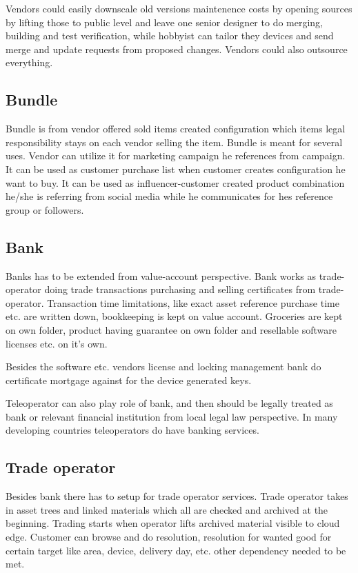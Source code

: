Vendors could easily downscale old versions maintenence costs by opening
sources by lifting those to public level and leave one senior designer to
do merging, building and test verification, while hobbyist can tailor they
devices and send merge and update requests from proposed changes. Vendors
could also outsource everything.

\subsection{Bundle}\label{bundle}
Bundle is from vendor offered sold items created configuration which items
legal responsibility stays on each vendor selling the item. Bundle is meant
for several uses. Vendor can utilize it for marketing campaign he references
from campaign. It can be used as customer purchase list when customer creates
configuration he want to buy. It can be used as influencer-customer created
product combination he/she is referring from social media while he
communicates for hes reference group or followers.

\subsection{Bank}\label{bank}
Banks has to be extended from value-account perspective. Bank works as
trade-operator doing trade transactions purchasing and selling certificates
from trade-operator. Transaction time limitations, like exact asset reference
purchase time etc. are written down, bookkeeping is kept on value account.
Groceries are kept on own folder, product having guarantee on own folder and
resellable software licenses etc. on it's own.

Besides the software etc. vendors license and locking management bank do
certificate mortgage against for the device generated keys.

Teleoperator can also play role of bank, and then should be legally treated as
bank or relevant financial institution from local legal law perspective. In
many developing countries teleoperators do have banking services.

\subsection{Trade operator}\label{trade_operator}
Besides bank there has to setup for trade operator services. Trade operator
takes in asset trees and linked materials which all are checked and archived
at the beginning. Trading starts when operator lifts archived material
visible to cloud edge. Customer can browse and do resolution, resolution for
wanted good for certain target like area, device, delivery day, etc. other
dependency needed to be met. 


